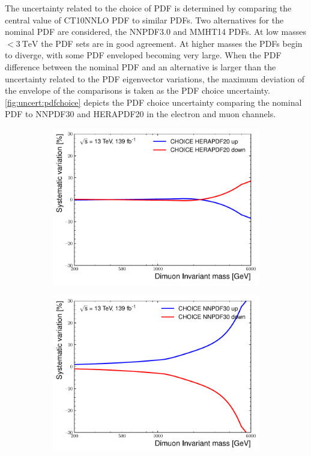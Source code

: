 The uncertainty related to the choice of PDF is determined by comparing the central value of CT10NNLO PDF to similar PDFs. Two alternatives for the nominal PDF are considered, the NNPDF3.0 and MMHT14 PDFs. At low masses $< \SI{3}{\tera\electronvolt}$ the PDF sets are in good agreement. At higher masses the PDFs begin to diverge, with some PDF enveloped becoming very large. When the PDF difference between the nominal PDF and an alternative is larger than the uncertainty related to the PDF eigenvector variations, the maximum deviation of the envelope of the comparisons is taken as the PDF choice uncertainty. \cref{fig:uncert:pdfchoice} depicts the PDF choice uncertainty comparing the nominal PDF to NNPDF30 and HERAPDF20 in the electron and muon channels. 
\begin{figure}[h!]
    \centering
    \begin{subfigure}[b]{0.42\textwidth}
        \centering
        \includegraphics[width=\textwidth]{figures/analysis/datamc/Uncertainties/theory/mm/backgroundTemplate_KF_CHOICE_HERAPDF20.pdf}
        \label{fig:uncert:mmchoiceHERA}
    \end{subfigure}
    \begin{subfigure}[b]{0.42\textwidth}
        \centering
        \includegraphics[width=\textwidth]{figures/analysis/datamc/Uncertainties/theory/mm/backgroundTemplate_KF_CHOICE_NNPDF30.pdf}

\end{subfigure}
\end{figure}
